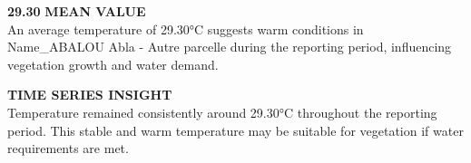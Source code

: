\documentclass[12pt,a4paper]{article}
\begin{document}
\vspace{0.5cm}

\parbox{\textwidth}{ %
    \begin{minipage}[t]{0.48\textwidth}
        \vspace{0.3cm}
        \textbf{\Large{29.30}}
        \vspace{0.3cm}
        \textbf{MEAN VALUE}\\
        An average temperature of 29.30°C suggests warm conditions in Name\_ABALOU Abla - Autre parcelle during the reporting period, influencing vegetation growth and water demand.
        \vspace{0.5cm}

        \textbf{TIME SERIES INSIGHT}\\
        Temperature remained consistently around 29.30°C throughout the reporting period. This stable and warm temperature may be suitable for vegetation if water requirements are met.
    \end{minipage}\hfill
    \begin{minipage}[t]{0.48\textwidth}
        \begin{center}
\end{center}
\end{minipage}}
\end{document}

